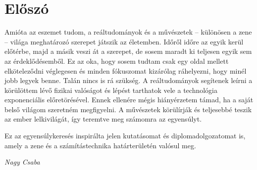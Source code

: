 \chapter*{Előszó}

Amióta az eszemet tudom, a reáltudományok és a művészetek -- különösen a zene -- világa meghatározó szerepet játszik az életemben. 
Időről időre az egyik kerül előtérbe, majd a másik veszi át a szerepet, de sosem maradt ki teljesen egyik sem az érdeklődésemből.
Ez az oka, hogy sosem tudtam csak egy oldal mellett elköteleződni véglegesen és minden fókuszomat kizárólag ráhelyezni, hogy minél jobb legyek benne. 
Talán nincs is rá szükség. A reáltudományok segítenek leírni a körülöttem lévő fizikai valóságot és lépést tarthatok vele a technológia exponenciális előretörésével. 
Ennek ellenére mégis hiányérzetem támad, ha a saját belső világom szeretném megfigyelni. A művészetek körülírják és teljesebbé teszik az ember lelkivilágát, 
így teremtve meg számomra az egyensúlyt.

Ez az egyensúlykeresés inspirálta jelen kutatásomat és diplomadolgozatomat is, amely a zene és a számítástechnika határterületén valósul meg.

\medskip

\begin{flushright}
  \textit{Nagy Csaba}
\end{flushright}
